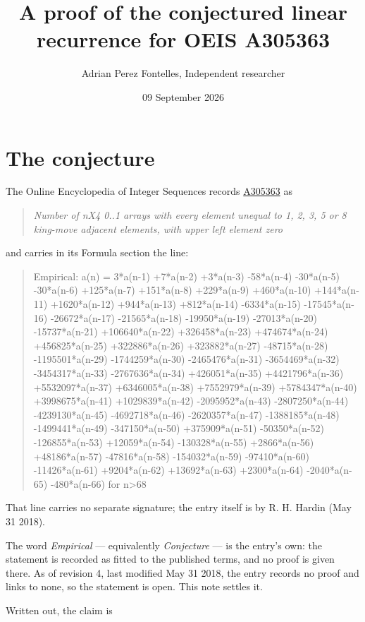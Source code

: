 \documentclass[11pt]{article}
\title{A proof of the conjectured linear recurrence for OEIS A305363}
\author{Adrian Perez Fontelles, Independent researcher}
\date{09 September 2026}
\theoremstyle{definition}
\begin{document}
\maketitle
\section{The conjecture}

The Online Encyclopedia of Integer Sequences records \href{https://oeis.org/A305363}{A305363} as

\begin{quote}\itshape Number of nX4 0..1 arrays with every element unequal to 1, 2, 3, 5 or 8 king-move adjacent elements, with upper left element zero\end{quote}

and carries in its Formula section the line:

\begin{quote}\ttfamily Empirical: a(n) = 3*a(n-1) +7*a(n-2) +3*a(n-3) -58*a(n-4) -30*a(n-5) -30*a(n-6) +125*a(n-7) +151*a(n-8) +229*a(n-9) +460*a(n-10) +144*a(n-11) +1620*a(n-12) +944*a(n-13) +812*a(n-14) -6334*a(n-15) -17545*a(n-16) -26672*a(n-17) -21565*a(n-18) -19950*a(n-19) -27013*a(n-20) -15737*a(n-21) +106640*a(n-22) +326458*a(n-23) +474674*a(n-24) +456825*a(n-25) +322886*a(n-26) +323882*a(n-27) -48715*a(n-28) -1195501*a(n-29) -1744259*a(n-30) -2465476*a(n-31) -3654469*a(n-32) -3454317*a(n-33) -2767636*a(n-34) +426051*a(n-35) +4421796*a(n-36) +5532097*a(n-37) +6346005*a(n-38) +7552979*a(n-39) +5784347*a(n-40) +3998675*a(n-41) +1029839*a(n-42) -2095952*a(n-43) -2807250*a(n-44) -4239130*a(n-45) -4692718*a(n-46) -2620357*a(n-47) -1388185*a(n-48) -1499441*a(n-49) -347150*a(n-50) +375909*a(n-51) -50350*a(n-52) -126855*a(n-53) +12059*a(n-54) -130328*a(n-55) +2866*a(n-56) +48186*a(n-57) -47816*a(n-58) -154032*a(n-59) -97410*a(n-60) -11426*a(n-61) +9204*a(n-62) +13692*a(n-63) +2300*a(n-64) -2040*a(n-65) -480*a(n-66) for n>68\end{quote}

That line carries no separate signature; the entry itself is by R. H. Hardin (May 31 2018).

The word {\itshape Empirical} --- equivalently {\itshape Conjecture} --- is the entry's own: the statement is recorded as fitted to the published terms, and no proof is given there. As of revision 4, last modified May 31 2018, the entry records no proof and links to none, so the statement is open. This note settles it.

Written out, the claim is
\end{document}

